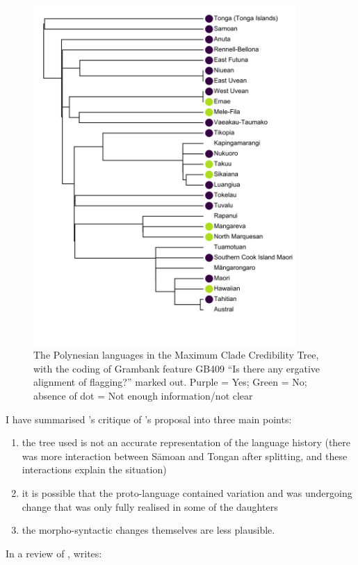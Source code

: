 \documentclass[12pt,letterpaper]{article}
\begin{document}
\begin{figure}[p]
\centering
\includegraphics[width=10cm]{illustrations/plots_from_R//tree_plots/poly_tree_example.png}
\caption{{The Polynesian languages in the \citet{grayetal_2009} Maximum Clade Credibility Tree, with the coding of Grambank feature GB409 ``Is there any ergative alignment of flagging?'' marked out. Purple = Yes; Green = No; absence of dot = Not enough information/not clear}}
\label{poly_GB409_tree}
\end{figure} 

I have summarised \citeauthor{chung1978}'s critique of \citeauthor{clark1973aspects}'s proposal into three main points:
 
\begin{enumerate}[label=(\alph*)]
\item the tree used is not an accurate representation of the language history (there was more interaction between S\={a}moan and Tongan after splitting, and these interactions explain the situation)
\item it is possible that the proto-language contained variation and was undergoing change that was only fully realised in some of the daughters
\item the morpho-syntactic changes themselves are less plausible.
\end{enumerate}

In a review of \citet{clark1973aspects}, \citet[539]{chung1977aspects} writes:
\end{document}
